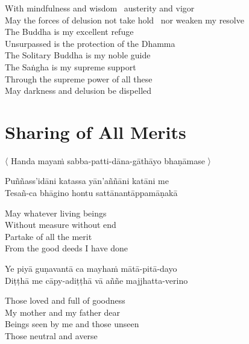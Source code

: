 \begin{english}
  With mindfulness and wisdom \breathmark\ austerity and vigor\\
  May the forces of delusion
  not take hold \breathmark\ nor weaken my resolve\\
  The Buddha is my excellent refuge\\
  Unsurpassed is the protection of the Dhamma\\
  The Solitary Buddha is my noble guide\\
  The Saṅgha is my supreme support\\
  Through the supreme power of all these\\
  May darkness and delusion be dispelled
\end{english}

\suttaRef{[Trad]}


\section{Sharing of All Merits}
\label{sharing-all-merits}

\begin{leader}
  〈 Handa mayaṁ sabba-patti-dāna-gāthāyo bhaṇāmase 〉

\end{leader}

Puññass'idāni katassa yān'aññāni katāni me\\
Tesañ-ca bhāgino hontu sattānantāppamāṇakā

\begin{english}
  May whatever living beings\\
  Without measure without end\\
  Partake of all the merit\\
  From the good deeds I have done
\end{english}

Ye piyā guṇavantā ca mayhaṁ mātā-pitā-dayo\\
Diṭṭhā me cāpy-adiṭṭhā vā aññe majjhatta-verino

\begin{english}
  Those loved and full of goodness\\
  My mother and my father dear\\
  Beings seen by me and those unseen\\
  Those neutral and averse
\end{english}

